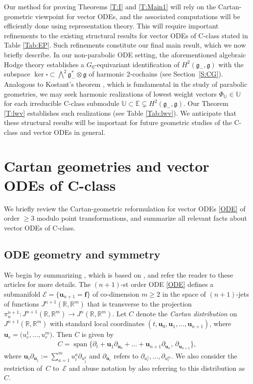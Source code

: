 \documentclass[pdftex]{sigma}%
\newcommand\tensor{\otimes}
\DeclareMathOperator{\sn}{span}
\newcommand{\g}{\mathfrak{g}}
\newcommand\bu{\mathbf{u}}
\newcommand{\R}{\mathbb{R}}
\newcommand\bbE{\mathbb{E}}
\newcommand\bbU{\mathbb{U}}
\newcommand\cE{\mathcal{E}}
\numberwithin{equation}{section}
\begin{document}
Our method for proving Theorems \ref{T:I} and \ref{T:Main1} will rely on the Cartan-geometric viewpoint for vector ODEs, and the associated computations will be efficiently done using representation theory. This will require important refinements to the existing structural results for vector ODEs of C-class stated in Table \ref{Tab:EP}. Such refinements constitute our final main result, which we now briefly describe. In our non-parabolic ODE setting, the aforementioned algebraic Hodge theory establishes a $G_0$-equivariant identification of $H^2(\g_-,\g)$ with the subspace ${\ker \square \subset \bigwedge^2 \g_-^* \tensor \g}$ of harmonic 2-cochains (see Section~\ref{S:CG}). Analogous to Kostant's theorem \cite{Kostant1961}, which is fundamental in the study of parabolic geometries, we may seek harmonic realizations of lowest weight vectors $\Phi_\bbU \in \bbU$ for each irreducible C-class submodule $\bbU \subset \bbE \subsetneq H^2(\g_-,\g)$. Our Theorem \ref{T:lwv} establishes such realizations (see Table \ref{Tab:lwv}). We anticipate that these structural results will be important for future geometric studies of the C-class and vector ODEs in general.

\section{Cartan geometries and vector ODEs of C-class} \label{S:CGP}

We briefly review the Cartan-geometric reformulation for vector ODEs \eqref{ODE} of order $\ge 3$ modulo point transformations, and summarize all relevant facts about vector ODEs of C-class.

\subsection{ODE geometry and symmetry}\label{S:GS}

We begin by summarizing \cite[Section~2.1]{KT2021}, which is based on \cite{Doubrov2001,DKM1999,DM2014}, and refer the reader to these articles for more details. The $(n+1)$-st order ODE \eqref{ODE} defines a submanifold ${\mathcal{E} = \{ \bu_{n+1} = \mathbf{f} \}}$ of co-dimension $m \ge 2$ in the space of $(n+1)$-jets of functions $J^{n+1}(\R, \R^m)$ that is transverse to the projection $\pi_n^{n+1}\colon J^{n+1}(\R, \R^m) \to J^{n}(\R, \R^m)$. Let $C$ denote the {\em Cartan distribution} on $J^{n+1}(\R, \R^m)$ with standard local coordinates $(t, \bu_0, \bu_1,\dots,\bu_{n+1})$, where $\bu_r = \big(u_r^1,\dots,u_r^m\big)$. Then $C$ is given by
\begin{align*}
C = \sn \{\partial_t + \bu_1 \partial_{\bu_0} + \dots + \bu_{n+1} \partial_{\bu_n},\, \partial_{\bu_{n+1}} \},
\end{align*}
where $\bu_i \partial_{\bu_j} :=\sum_{a=1}^m u_i^a \partial_{u_j^a}$ and $\partial_{\bu_r}$ refers to $\partial_{u_r^1},\dots,\partial_{u_r^m}$. We also consider the restriction of~$C$ to~$\cE$ and abuse notation by also referring to this distribution as $C$.
	
\end{document}
